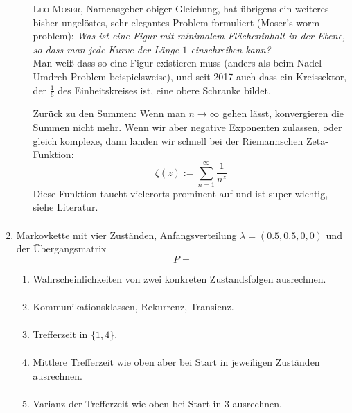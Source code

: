 \documentclass[a4paper,11pt,notitlepage,fullpage]{article}
\begin{document}
\begin{enumerate}
\begin{enumerate}
\textsc{Leo Moser}, Namensgeber obiger Gleichung, hat übrigens ein weiteres bisher ungelöstes, sehr elegantes Problem formuliert (Moser's worm problem):
\emph{Was ist eine Figur mit minimalem Flächeninhalt in der Ebene, so dass man jede Kurve der Länge $1$ einschreiben kann?}\\
Man weiß dass so eine Figur existieren muss (anders als beim Nadel-Umdreh-Problem beispielsweise), und seit 2017 auch dass ein Kreissektor, der $\frac{1}{6}$ des Einheitskreises ist, eine obere Schranke bildet.


Zurück zu den Summen: Wenn man $n\rightarrow \infty$ gehen lässt, konvergieren die Summen nicht mehr. Wenn wir aber negative Exponenten zulassen, oder gleich komplexe, dann landen wir schnell bei der Riemannschen Zeta-Funktion:
$$\zeta (z) := \sum_{n=1}^\infty \frac{1}{n^z}$$
Diese Funktion taucht vielerorts prominent auf und ist super wichtig, siehe Literatur.
\begin{align*}
\end{align*}
\end{enumerate}

\item Markovkette mit vier Zuständen, Anfangsverteilung $\lambda = (0.5, 0.5, 0, 0)$ und der Übergangsmatrix
$$P=$$
\begin{enumerate}
\item Wahrscheinlichkeiten von zwei konkreten Zustandsfolgen ausrechnen.
\begin{align*}
\end{align*}

\item Kommunikationsklassen, Rekurrenz, Transienz.
\begin{align*}
\end{align*}

\item Trefferzeit in $\{1, 4\}$.
\begin{align*}
\end{align*}

\item Mittlere Trefferzeit wie oben aber bei Start in jeweiligen Zuständen ausrechnen.
\begin{align*}
\end{align*}

\item Varianz der Trefferzeit wie oben bei Start in $3$ ausrechnen.
\begin{align*}
\end{align*}
\end{enumerate}


\end{enumerate}
\end{document}
